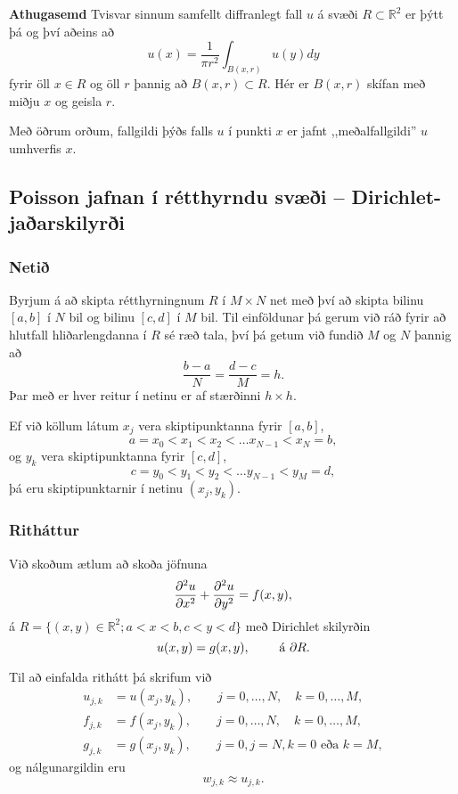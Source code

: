 \documentclass[icelandic,a4paper,12pt]{article}
\newcommand{\R}{{\mathbb  R}}
\begin{document}
 
 \pause
 \textbf{Athugasemd}
  Tvisvar sinnum samfellt diffranlegt fall $u$ á svæði $R \subset \R^2$ er 
  þýtt þá og því aðeins að 
  $$
  u(x) = \frac{1}{\pi r^2} \int_{B(x,r)} u(y) dy
  $$
  fyrir öll $x \in R$ og öll $r$ þannig að $B(x,r) \subset R$. Hér er
  $B(x,r)$ skífan með miðju $x$ og geisla $r$.
  
  \pause
  Með öðrum orðum, fallgildi þýðs falls $u$ í punkti $x$ er jafnt ,,meðalfallgildi''
  $u$ umhverfis $x$.
 


\subsection{Poisson jafnan í rétthyrndu svæði --  Dirichlet-jaðarskilyrði }

\subsubsection{Netið}
 Byrjum á að skipta rétthyrningnum $R$ í $M \times N$ net með því að skipta
 bilinu $[a,b]$ í $N$ bil og bilinu $[c,d]$ í $M$ bil. \pause
 Til einföldunar þá gerum við ráð fyrir að hlutfall hliðarlengdanna
 í $R$ sé ræð tala, því þá getum við fundið $M$ og $N$ þannig að
 $$
  \frac{b-a}N = \frac{d-c}M = h.
 $$ \pause
 Þar með er hver reitur í netinu er af stærðinni $h \times h$.
 \pause
 \medskip
 
 Ef við köllum látum $x_j$ vera skiptipunktanna fyrir $[a,b]$,
 $$
 a=x_0 < x_1 < x_2 < \ldots x_{N-1} < x_N =b,
 $$
 og $y_k$ vera skiptipunktanna fyrir $[c,d]$,
 $$
 c=y_0 < y_1 < y_2 < \ldots y_{N-1} < y_M = d,
 $$
 þá eru skiptipunktarnir í netinu $(x_j,y_k)$.



\subsubsection{Ritháttur}
Við skoðum ætlum að skoða jöfnuna
 $$ 
    \frac{{\partial}^2 u}{{\partial} x^2} + \frac{{\partial}^2 u}{{\partial} y^2} = f(x,y),
  $$
  á $R = \{ (x,y) \in \R^2 ; a < x < b, c < y < d \}$ með Dirichlet skilyrðin
  $$
    u(x,y) = g(x,y), \qquad \text{ á } {\partial} R.
  $$
  
  \medskip\pause
Til að einfalda rithátt þá skrifum við
\begin{align*}
 u_{j,k} &= u(x_j,y_k), \qquad j=0,\ldots,N, \quad k=0,\ldots,M,\\
 f_{j,k} &= f(x_j,y_k), \qquad j=0,\ldots,N, \quad k=0,\ldots,M,\\
 g_{j,k} &= g(x_j,y_k), \qquad j=0, j=N, k=0 \text{ eða } k=M,
\end{align*} \pause
og nálgunargildin eru 
$$
  w_{j,k} \approx u_{j,k}.
$$
\end{document}
